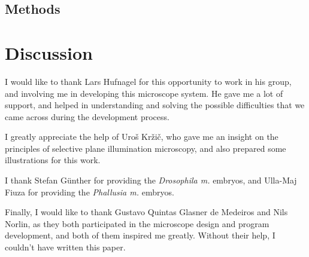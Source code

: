 \documentclass{diploma_style}
\begin{document}
\section{Methods}


\chapter{Discussion}



\newpage
\cleardoublepage
{}
\begin{acknowledgements}

I would like to thank Lars Hufnagel for this opportunity to work in his group, and involving me in developing this microscope system. He gave me a lot of support, and helped in understanding and solving the possible difficulties that we came across during the development process.

I greatly appreciate the help of Uroš Kržič, who gave me an insight on the principles of selective plane illumination microscopy, and also prepared some illustrations for this work.

I thank Stefan Günther for providing the \textit{Drosophila m.} embryos, and \mbox{Ulla-Maj} Fiuza for providing the \textit{Phallusia m.} embryos.

Finally, I would like to thank Gustavo Quintas Glasner de Medeiros and Nils Norlin, as they both participated in the microscope design and program development, and both of them inspired me greatly. Without their help, I couldn't have written this paper.

\end{acknowledgements}

\cleardoublepage
{}
{}


\end{document}

